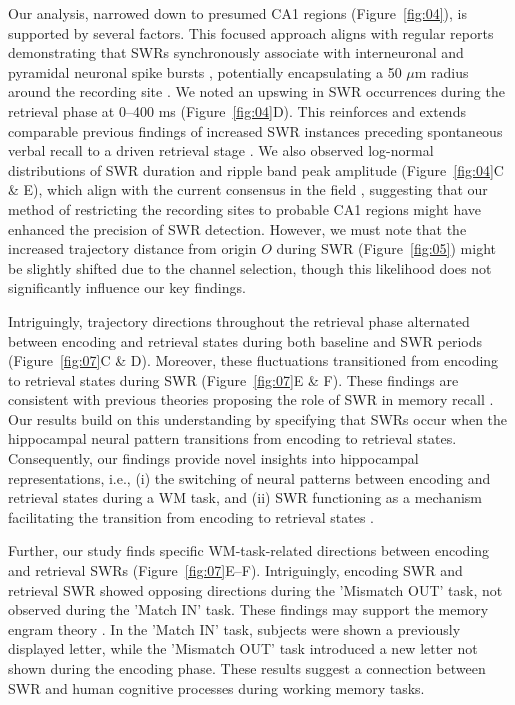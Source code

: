 \documentclass[final,3p,times,twocolumn]{elsarticle}
\begin{document}
Our analysis, narrowed down to presumed CA1 regions (Figure~\ref{fig:04}), is supported by several factors. This focused approach aligns with regular reports demonstrating that SWRs synchronously associate with interneuronal and pyramidal neuronal spike bursts \cite{buzsaki_two-stage_1989,quyen_cell_2008,royer_control_2012,hajos_input-output_2013}, potentially encapsulating a 50 $\mu$m radius around the recording site \cite{schomburg_spiking_2012}. We noted an upswing in SWR occurrences during the retrieval phase at 0--400 ms (Figure~\ref{fig:04}D). This reinforces and extends comparable previous findings of increased SWR instances preceding spontaneous verbal recall to a driven retrieval stage \cite{norman_hippocampal_2019, norman_hippocampal_2021}. We also observed log-normal distributions of SWR duration and ripple band peak amplitude (Figure~\ref{fig:04}C \& E), which align with the current consensus in the field \cite{liu_consensus_2022}, suggesting that our method of restricting the recording sites to probable CA1 regions might have enhanced the precision of SWR detection. However, we must note that the increased trajectory distance from origin $O$ during SWR (Figure~\ref{fig:05}) might be slightly shifted due to the channel selection, though this likelihood does not significantly influence our key findings.

Intriguingly, trajectory directions throughout the retrieval phase alternated between encoding and retrieval states during both baseline and SWR periods (Figure~\ref{fig:07}C \& D). Moreover, these fluctuations transitioned from encoding to retrieval states during SWR (Figure~\ref{fig:07}E \& F). These findings are consistent with previous theories proposing the role of SWR in memory recall \cite{norman_hippocampal_2019, norman_hippocampal_2021}. Our results build on this understanding by specifying that SWRs occur when the hippocampal neural pattern transitions from encoding to retrieval states. Consequently, our findings provide novel insights into hippocampal representations, i.e., (i) the switching of neural patterns between encoding and retrieval states during a WM task, and (ii) SWR functioning as a mechanism facilitating the transition from encoding to retrieval states \cite{buzsaki_hippocampal_2015}.

Further, our study finds specific WM-task-related directions between encoding and retrieval SWRs (Figure~\ref{fig:07}E--F). Intriguingly, encoding SWR and retrieval SWR showed opposing directions during the 'Mismatch OUT' task, not observed during the 'Match IN' task. These findings may support the memory engram theory \cite{liu_optogenetic_2012}. In the 'Match IN' task, subjects were shown a previously displayed letter, while the 'Mismatch OUT' task introduced a new letter not shown during the encoding phase. These results suggest a connection between SWR and human cognitive processes during working memory tasks.
\end{document}
